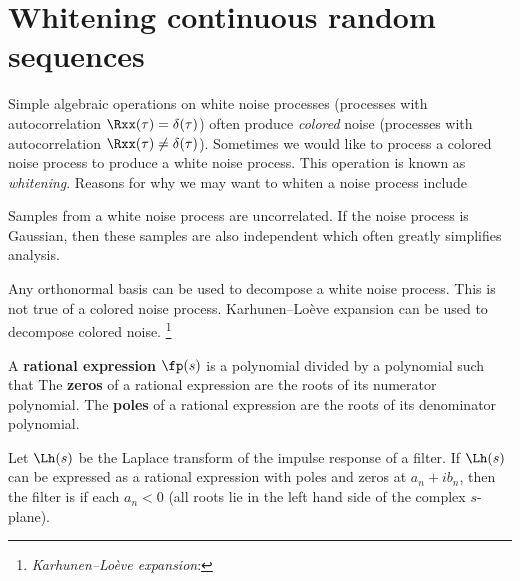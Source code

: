 \section{Whitening continuous random sequences}
\label{sec:whiten}
Simple algebraic operations on white noise processes
(processes with autocorrelation $\Rxx(\tau)=\delta(\tau)$)
often produce {\em colored} noise
(processes with autocorrelation $\Rxx(\tau)\ne\delta(\tau)$).
Sometimes we would like to process a colored noise process
to produce a white noise process.
This operation is known as {\em whitening}.
Reasons for why we may want to whiten a noise process include
\begin{enume}
   \item Samples from a white noise process are uncorrelated.
         If the noise process is Gaussian, then these samples
         are also independent which often greatly simplifies analysis.
   \item Any orthonormal basis can be used to decompose a white noise process.
         This is not true of a colored noise process.
         Karhunen--Lo\`eve expansion can be used to decompose colored noise.
         \footnote{{\em Karhunen--Lo\`eve expansion}: }
\end{enume}

\begin{definition}
A \textbf{rational expression} $\fp(s)$ is a polynomial divided by a polynomial
such that
The \textbf{zeros} of a rational expression are the roots of its numerator polynomial.
The \textbf{poles} of a rational expression are the roots of its denominator polynomial.
\end{definition}

\begin{definition}
Let $\Lh(s)$ be the Laplace transform of the impulse response of a filter.
If $\Lh(s)$ can be expressed as a rational expression with poles and zeros at
$a_n + ib_n$,
then the filter is  if each $a_n<0$
(all roots lie in the left hand side of the complex $s$-plane).
\end{definition}

